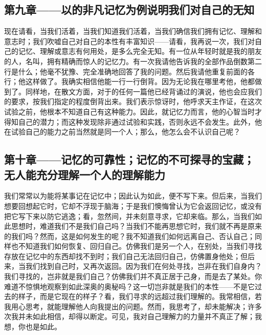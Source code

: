 
\subsection{第九章——以的非凡记忆为例说明我们对自己的无知}

现在请看，当我们活着，当我们知道我们活着，当我们确信我们拥有记忆、理解和意志时；我们吹嘘自己对自己的本性有丰富知识——请看，我再说一次，我们对自己的记忆、理解或意志有何用处，是多么完全无知。有一位从年轻时就是我的朋友的人，名叫，拥有精确而惊人的记忆力。有一次我请他告诉我的全部作品倒数第二行是什么；他毫不犹豫、完全准确地回答了我的问题。然后我请他重复前面的各行；他这样做了。我确实相信他能一行一行倒背。因为无论我在哪里考他，他都做到了。同样地，在散文方面，对于的任何一篇他已经背诵过的演说，他也会应我们的要求，按我们指定的程度倒背出来。我们表示惊讶时，他呼求天主作证，在这次试验之前，他根本不知道自己有这种能力。因此，就记忆力而言，他的心智当时才得知自己的潜力；而这种发现除非通过试验和实践，否则永远不会发生。此外，他在试验自己的能力之前当然就是同一个人；那么，他怎么会不认识自己呢？\par


\subsection{第十章——记忆的可靠性；记忆的不可探寻的宝藏；无人能充分理解一个人的理解能力}

我们常常以为能将某事记在记忆中；因此认为如此，便不写下来。但后来，当我们想要回想起它时，它却不浮现于脑海；于是我们懊悔曾认为它会返回记忆，或没有把它写下来以防它逃逸；看，忽然间，并未刻意寻求，它却来临。那么，当我们如此思想时，难道我们不是我们自己吗？当我们不能再思想它时，我们就不再是原来的我们吗？然而，这是如何发生的呢？我不知道我们如何远离自己、否认自己；同样也不知道我们如何恢复、回归自己。仿佛我们是另一个人，在别处，当我们寻找存放在记忆中的东西却找不到时；我们自己无法回归自己，仿佛置身他处；但后来，当我们找到自己时，又再次返回。因为我们在何处寻找，岂非在我们自身内？我们寻找的，岂非就是我们自己？仿佛我们并不真正居于己身，而是去了某处。你难道不惊惧地观察到如此深奥的奥秘吗？这一切岂非就是我们的本性——不是它过去的样子，而是它现在的样子？看，我们寻求的远超过我们理解的。我常相信，若我用心思考，就能理解他人向我提出的问题。然而，我思考了，却未能解决；许多次我并未如此相信，却得以断定。可见，我对自己理解力的力量并不真正了解；我想，你也是如此。\par

